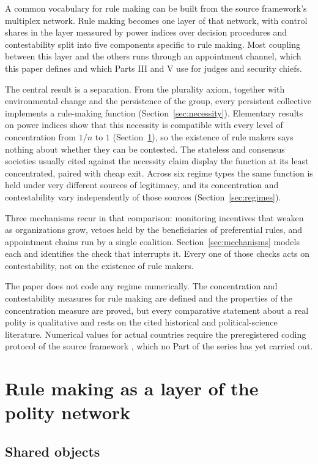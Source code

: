 \documentclass[11pt,letterpaper]{article}
\theoremstyle{definition}
\theoremstyle{remark}
\begin{document}
A common vocabulary for rule making can be built from the source framework's multiplex network. Rule making becomes one layer of that network, with control shares in the layer measured by power indices over decision procedures and contestability split into five components specific to rule making. Most coupling between this layer and the others runs through an appointment channel, which this paper defines and which Parts III and V use for judges and security chiefs.

The central result is a separation. From the plurality axiom, together with environmental change and the persistence of the group, every persistent collective implements a rule-making function (Section~\ref{sec:necessity}). Elementary results on power indices show that this necessity is compatible with every level of concentration from $1/n$ to $1$ (Section~\ref{sec:layer}), so the existence of rule makers says nothing about whether they can be contested. The stateless and consensus societies usually cited against the necessity claim display the function at its least concentrated, paired with cheap exit. Across six regime types the same function is held under very different sources of legitimacy, and its concentration and contestability vary independently of those sources (Section~\ref{sec:regimes}).

Three mechanisms recur in that comparison: monitoring incentives that weaken as organizations grow, vetoes held by the beneficiaries of preferential rules, and appointment chains run by a single coalition. Section~\ref{sec:mechanisms} models each and identifies the check that interrupts it. Every one of those checks acts on contestability, not on the existence of rule makers.

The paper does not code any regime numerically. The concentration and contestability measures for rule making are defined and the properties of the concentration measure are proved, but every comparative statement about a real polity is qualitative and rests on the cited historical and political-science literature. Numerical values for actual countries require the preregistered coding protocol of the source framework \citep{largo2026hbs}, which no Part of the series has yet carried out.

\section{Rule making as a layer of the polity network}
\label{sec:layer}

\subsection{Shared objects}
\end{document}
